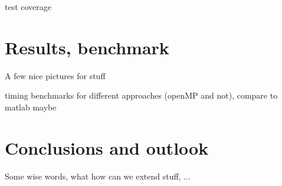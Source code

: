 \documentclass[11pt]{scrartcl}
\begin{document}
test coverage


\section{Results, benchmark}
A few nice pictures for stuff

timing benchmarks for different approaches (openMP and not), compare to matlab maybe


\section{Conclusions and outlook}
Some wise words, what how can we extend stuff, ...


%
\end{document}
